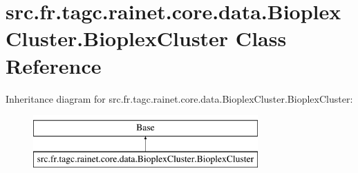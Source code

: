 \hypertarget{classsrc_1_1fr_1_1tagc_1_1rainet_1_1core_1_1data_1_1BioplexCluster_1_1BioplexCluster}{\section{src.\-fr.\-tagc.\-rainet.\-core.\-data.\-Bioplex\-Cluster.\-Bioplex\-Cluster Class Reference}
\label{classsrc_1_1fr_1_1tagc_1_1rainet_1_1core_1_1data_1_1BioplexCluster_1_1BioplexCluster}
}
Inheritance diagram for src.\-fr.\-tagc.\-rainet.\-core.\-data.\-Bioplex\-Cluster.\-Bioplex\-Cluster\-:\begin{figure}[H]
\begin{center}
\leavevmode
\includegraphics[height=2.000000cm]{classsrc_1_1fr_1_1tagc_1_1rainet_1_1core_1_1data_1_1BioplexCluster_1_1BioplexCluster}
\end{center}
\end{figure}
